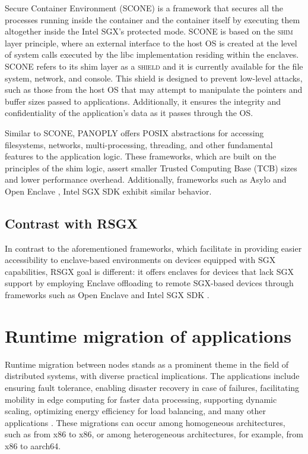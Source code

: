 \documentclass[article, doublespace,nopageskip]{VTthesis} %
\newcommand{\monitor}{RSGX \xspace}
\begin{document}
    Secure Container Environment (SCONE) \cite{SCONE} is a framework that secures all the processes running inside the container and the container itself by executing them altogether inside the Intel SGX's protected mode. SCONE is based on the \textsc{shim} layer principle, where an external interface to the host OS is created at the level of system calls executed by the libc implementation residing within the enclaves. SCONE refers to its shim layer as a \textsc{shield} and it is currently available for the file system, network, and console. This shield is designed to prevent low-level attacks, such as those from the host OS that may attempt to manipulate the pointers and buffer sizes passed to applications. Additionally, it ensures the integrity and confidentiality of the application's data as it passes through the OS.

    Similar to SCONE, PANOPLY \cite{PANOPLY} offers POSIX abstractions for accessing filesystems, networks, multi-processing, threading, and other fundamental features to the application logic. These frameworks, which are built on the principles of the shim logic, assert smaller Trusted Computing Base (TCB) sizes and lower performance overhead.  Additionally, frameworks such as Asylo \cite{Asylo} and Open Enclave \cite{Open-Enclave}, Intel SGX SDK \cite{Intel-SGX} exhibit similar behavior.

    \subsection{Contrast with \monitor}
    In contrast to the aforementioned frameworks, which facilitate in providing easier accessibility to enclave-based environments on devices equipped with SGX capabilities, \monitor goal is different: it offers enclaves for devices that lack SGX support by employing Enclave offloading to remote SGX-based devices through frameworks such as Open Enclave \cite{Open-Enclave} and Intel SGX SDK \cite{Intel-SGX}. 

    \section{Runtime migration of applications} \label{ase: Runtime_migrations}
    Runtime migration between nodes stands as a prominent theme in the field of distributed systems, with diverse practical implications. The applications include ensuring fault tolerance, enabling disaster recovery in case of failures, facilitating mobility in edge computing for faster data processing, supporting dynamic scaling, optimizing energy efficiency for load balancing, and many other applications \cite{CRIUMigration}. These migrations can occur among homogeneous architectures, such as from x86 to x86, or among heterogeneous architectures, for example, from x86 to aarch64.
\end{document}
